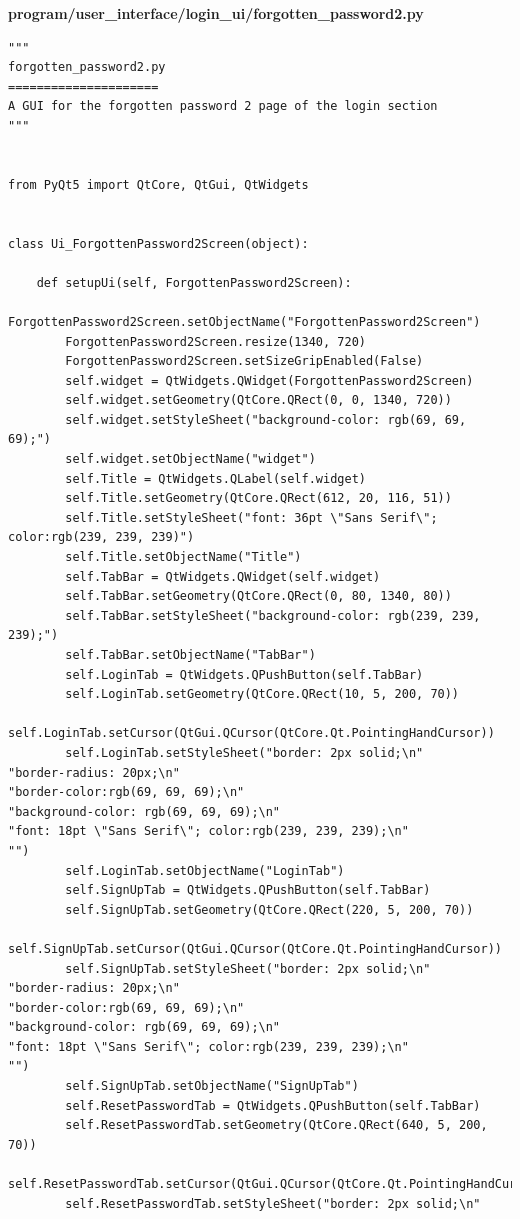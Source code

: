 \documentclass[12pt]{article}
\begin{document}
\textbf{program/user\_interface/login\_ui/forgotten\_password2.py}
\begin{lstlisting}
"""
forgotten_password2.py
=====================
A GUI for the forgotten password 2 page of the login section
"""


from PyQt5 import QtCore, QtGui, QtWidgets


class Ui_ForgottenPassword2Screen(object):

    def setupUi(self, ForgottenPassword2Screen):
        ForgottenPassword2Screen.setObjectName("ForgottenPassword2Screen")
        ForgottenPassword2Screen.resize(1340, 720)
        ForgottenPassword2Screen.setSizeGripEnabled(False)
        self.widget = QtWidgets.QWidget(ForgottenPassword2Screen)
        self.widget.setGeometry(QtCore.QRect(0, 0, 1340, 720))
        self.widget.setStyleSheet("background-color: rgb(69, 69, 69);")
        self.widget.setObjectName("widget")
        self.Title = QtWidgets.QLabel(self.widget)
        self.Title.setGeometry(QtCore.QRect(612, 20, 116, 51))
        self.Title.setStyleSheet("font: 36pt \"Sans Serif\"; color:rgb(239, 239, 239)")
        self.Title.setObjectName("Title")
        self.TabBar = QtWidgets.QWidget(self.widget)
        self.TabBar.setGeometry(QtCore.QRect(0, 80, 1340, 80))
        self.TabBar.setStyleSheet("background-color: rgb(239, 239, 239);")
        self.TabBar.setObjectName("TabBar")
        self.LoginTab = QtWidgets.QPushButton(self.TabBar)
        self.LoginTab.setGeometry(QtCore.QRect(10, 5, 200, 70))
        self.LoginTab.setCursor(QtGui.QCursor(QtCore.Qt.PointingHandCursor))
        self.LoginTab.setStyleSheet("border: 2px solid;\n"
"border-radius: 20px;\n"
"border-color:rgb(69, 69, 69);\n"
"background-color: rgb(69, 69, 69);\n"
"font: 18pt \"Sans Serif\"; color:rgb(239, 239, 239);\n"
"")
        self.LoginTab.setObjectName("LoginTab")
        self.SignUpTab = QtWidgets.QPushButton(self.TabBar)
        self.SignUpTab.setGeometry(QtCore.QRect(220, 5, 200, 70))
        self.SignUpTab.setCursor(QtGui.QCursor(QtCore.Qt.PointingHandCursor))
        self.SignUpTab.setStyleSheet("border: 2px solid;\n"
"border-radius: 20px;\n"
"border-color:rgb(69, 69, 69);\n"
"background-color: rgb(69, 69, 69);\n"
"font: 18pt \"Sans Serif\"; color:rgb(239, 239, 239);\n"
"")
        self.SignUpTab.setObjectName("SignUpTab")
        self.ResetPasswordTab = QtWidgets.QPushButton(self.TabBar)
        self.ResetPasswordTab.setGeometry(QtCore.QRect(640, 5, 200, 70))
        self.ResetPasswordTab.setCursor(QtGui.QCursor(QtCore.Qt.PointingHandCursor))
        self.ResetPasswordTab.setStyleSheet("border: 2px solid;\n"

\end{lstlisting}
\end{document}
